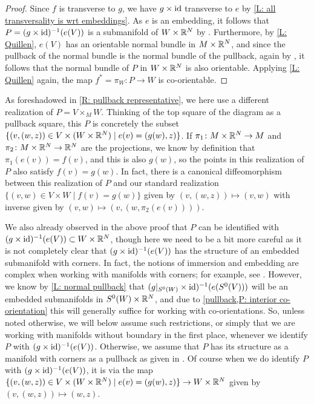 \begin{proof}
	Since $f$ is transverse to $g$, we have $g \times \mathrm{id}$ transverse to $e$ by \cref{L: all transversality is wrt embeddings}.
	As $e$ is an embedding, it follows that $P = (g \times \mathrm{id})^{-1}(e(V))$ is a submanifold of $W \times \mathbb{R}^N$ by \cite[Proposition IV.1.4]{Kos93}.
	Furthermore, by \cref{L: Quillen}, $e(V)$ has an orientable normal bundle in $M \times \mathbb{R}^N$, and since the pullback of the normal bundle is the normal bundle of the pullback, again by \cite[Proposition IV.1.4]{Kos93}, it follows that the normal bundle of $P$ in $W \times \mathbb{R}^N$ is also orientable.
	Applying \cref{L: Quillen} again, the map $f^* = \pi_W \colon P \to W$ is co-orientable.
\end{proof}

\begin{remark}\label{R: pullback representative 2}
	As foreshadowed in \cref{R: pullback representative}, we here use a different realization of $P = V \times_M W$.
	Thinking of the top square of the diagram as a pullback square, this $P$ is concretely the subset $\{(v,(w,z)) \in V \times (W \times \mathbb{R}^N) \mid e(v) = (g(w),z)\}$.
	If $\pi_1 \colon M \times \mathbb{R}^N \to M$ and $\pi_2 \colon M \times \mathbb{R}^N \to \mathbb{R}^N$ are the projections, we know by definition that $\pi_1(e(v)) = f(v)$, and this is also $g(w)$, so the points in this realization of $P$ also satisfy $f(v) = g(w)$.
	In fact, there is a canonical diffeomorphism between this realization of $P$ and our standard realization $\{(v,w) \in V \times W \mid f(v) = g(w)\}$ given by $(v,(w,z)) \mapsto (v,w)$ with inverse given by $(v,w) \mapsto (v,(w,\pi_2(e(v))))$.

	We also already observed in the above proof that $P$ can be identified with $(g \times \mathrm{id})^{-1}(e(V)) \subset W \times \mathbb{R}^N$, though here we need to be a bit more careful as it is not completely clear that $(g \times \mathrm{id})^{-1}(e(V))$ has the structure of an embedded submanifold with corners.
	In fact, the notions of immersion and embedding are complex when working with manifolds with corners; for example, see \cite[Chapter 3]{MaDo92}.
	However, we know by \cref{L: normal pullback} that $(g|_{S^0(W)} \times \mathrm{id})^{-1}(e(S^0(V)))$ will be an embedded submanifolds in $S^0(W)\times \mathbb{R}^N$, and due to \cref{pullback,P: interior co-orientation} this will generally suffice for working with co-orientations.
	So, unless noted otherwise, we will below assume such restrictions, or simply that we are working with manifolds without boundary in the first place, whenever we identify $P$ with $(g \times \mathrm{id})^{-1}(e(V))$.
	Otherwise, we assume that $P$ has its structure as a manifold with corners as a pullback as given in \cite{Joy12}.
	Of course when we do identify $P$ with $(g \times \mathrm{id})^{-1}(e(V))$, it is via the map $\{(v,(w,z)) \in V \times (W \times \mathbb{R}^N) \mid e(v) = (g(w),z)\} \to W \times \mathbb{R}^N$ given by $(v,(w,z)) \mapsto (w,z)$.
\end{remark}

